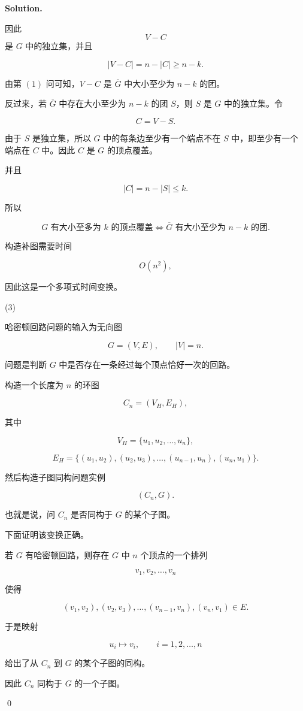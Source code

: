 \documentclass[11pt]{article}
\newenvironment{solution}{
\par\noindent\textbf{Solution.}\par\noindent
}{\qed}
\begin{document}
\begin{solution}
因此
\[
V-C
\]
是 $G$ 中的独立集，并且

\[
|V-C|=n-|C|\geq n-k.
\]

由第 $(1)$ 问可知，$V-C$ 是 $\overline{G}$ 中大小至少为 $n-k$ 的团。

反过来，若 $\overline{G}$ 中存在大小至少为 $n-k$ 的团 $S$，则 $S$ 是 $G$ 中的独立集。令

\[
C=V-S.
\]

由于 $S$ 是独立集，所以 $G$ 中的每条边至少有一个端点不在 $S$ 中，即至少有一个端点在 $C$ 中。因此 $C$ 是 $G$ 的顶点覆盖。

并且

\[
|C|=n-|S|\leq k.
\]

所以

\[
G \text{ 有大小至多为 } k \text{ 的顶点覆盖}
\iff
\overline{G} \text{ 有大小至少为 } n-k \text{ 的团}.
\]

构造补图需要时间

\[
O(n^2),
\]

因此这是一个多项式时间变换。

(3)

哈密顿回路问题的输入为无向图

\[
G=(V,E),
\qquad |V|=n.
\]

问题是判断 $G$ 中是否存在一条经过每个顶点恰好一次的回路。

构造一个长度为 $n$ 的环图

\[
C_n=(V_H,E_H),
\]

其中

\[
V_H=\{u_1,u_2,\ldots,u_n\},
\]

\[
E_H=\{(u_1,u_2),(u_2,u_3),\ldots,(u_{n-1},u_n),(u_n,u_1)\}.
\]

然后构造子图同构问题实例

\[
(C_n,G).
\]

也就是说，问 $C_n$ 是否同构于 $G$ 的某个子图。

下面证明该变换正确。

若 $G$ 有哈密顿回路，则存在 $G$ 中 $n$ 个顶点的一个排列

\[
v_1,v_2,\ldots,v_n
\]

使得

\[
(v_1,v_2),(v_2,v_3),\ldots,(v_{n-1},v_n),(v_n,v_1)\in E.
\]

于是映射

\[
u_i\mapsto v_i,\qquad i=1,2,\ldots,n
\]

给出了从 $C_n$ 到 $G$ 的某个子图的同构。

因此 $C_n$ 同构于 $G$ 的一个子图。


\end{solution}
\end{document}
